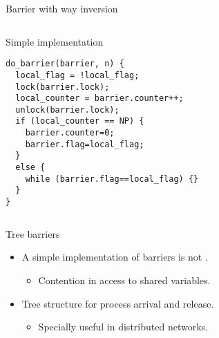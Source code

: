 \begin{frame}[t,fragile]{Barrier with way inversion}
\begin{columns}

\begin{block}{Simple implementation}
\begin{lstlisting}
do_barrier(barrier, n) {
  local_flag = !local_flag;
  lock(barrier.lock);
  local_counter = barrier.counter++;
  unlock(barrier.lock);
  if (local_counter == NP) {
    barrier.counter=0;
    barrier.flag=local_flag;
  }
  else {
    while (barrier.flag==local_flag) {}
  }
}
\end{lstlisting}
\end{block}


\end{columns}
\end{frame}

\begin{frame}[t]{Tree barriers}
\begin{itemize}
  \item A simple implementation of barriers is not .
    \begin{itemize}
      \item Contention in access to shared variables.
    \end{itemize}
  \item Tree structure for process arrival and release.
    \begin{itemize}
      \item Specially useful in distributed networks.
    \end{itemize}

\end{itemize}
\end{frame}
